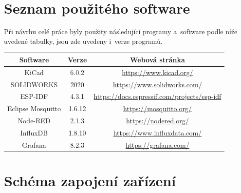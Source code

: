 \chapter{Seznam použitého software}

Při návrhu celé práce byly použity následující programy a~software podle níže uvedené tabulky, jsou zde uvedeny i~verze programů.

\bigskip
\begin{table}[!ht]
    \centering
    \begin{tabular}{|c|c|c|}
    \hline
        Software & Verze & Webová stránka \\ \hline
        KiCad & 6.0.2 & \href{https://www.kicad.org/}{https://www.kicad.org/} \\ \hline
        SOLIDWORKS & 2020 & \href{https://www.solidworks.com/}{https://www.solidworks.com/} \\ \hline
        ESP-IDF & 4.3.1 & \href{https://docs.espressif.com/projects/esp-idf}{https://docs.espressif.com/projects/esp-idf} \\ \hline
        Eclipse Mosquitto & 1.6.12 & \href{https://mosquitto.org/}{https://mosquitto.org/} \\ \hline
        Node-RED & 2.1.3 & \href{https://nodered.org/}{https://nodered.org/} \\ \hline
        InfluxDB & 1.8.10 & \href{https://www.influxdata.com/}{https://www.influxdata.com/} \\ \hline
        Grafana & 8.2.3 & \href{https://grafana.com/}{https://grafana.com/} \\ \hline
    \end{tabular}
\end{table}


\chapter{Schéma zapojení zařízení}



